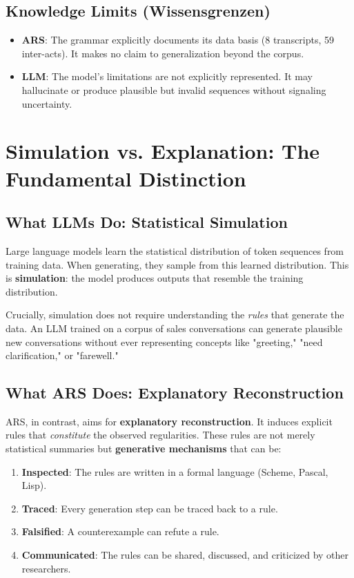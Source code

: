 \documentclass[12pt,a4paper]{article}
\begin{document}
\subsection{Knowledge Limits (Wissensgrenzen)}

\begin{itemize}
    \item \textbf{ARS}: The grammar explicitly documents its data basis 
    (8 transcripts, 59 inter-acts). It makes no claim to generalization beyond 
    the corpus.
    \item \textbf{LLM}: The model's limitations are not explicitly represented. 
    It may hallucinate or produce plausible but invalid sequences without 
    signaling uncertainty.
\end{itemize}

\section{Simulation vs. Explanation: The Fundamental Distinction}

\subsection{What LLMs Do: Statistical Simulation}

Large language models learn the statistical distribution of token sequences 
from training data. When generating, they sample from this learned distribution. 
This is \textbf{simulation}: the model produces outputs that resemble the 
training distribution.

Crucially, simulation does not require understanding the \textit{rules} that 
generate the data. An LLM trained on a corpus of sales conversations can 
generate plausible new conversations without ever representing concepts like 
"greeting," "need clarification," or "farewell."

\subsection{What ARS Does: Explanatory Reconstruction}

ARS, in contrast, aims for \textbf{explanatory reconstruction}. It induces 
explicit rules that \textit{constitute} the observed regularities. These rules 
are not merely statistical summaries but \textbf{generative mechanisms} that 
can be:

\begin{enumerate}
    \item \textbf{Inspected}: The rules are written in a formal language 
    (Scheme, Pascal, Lisp).
    \item \textbf{Traced}: Every generation step can be traced back to a rule.
    \item \textbf{Falsified}: A counterexample can refute a rule.
    \item \textbf{Communicated}: The rules can be shared, discussed, and 
    criticized by other researchers.
\end{enumerate}
\end{document}
